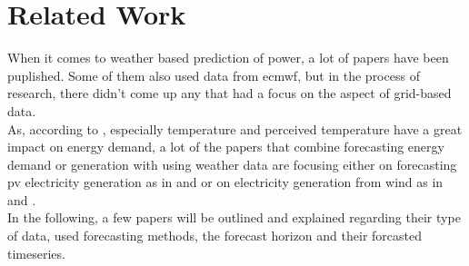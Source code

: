 \section{Related Work}
\label{sec:rw}

When it comes to weather based prediction of power, a lot of papers have been puplished. Some of them also used data from \gls{ecmwf}, but in the process of research, there didn't come up any that had a focus on the aspect of grid-based data.\\

As, according to , especially temperature and perceived temperature have a great impact on energy demand, a lot of the papers that combine forecasting energy demand or generation with using weather data are focusing either on forecasting \gls{pv} electricity generation as in  and  or on electricity generation from wind as in  and .\\

In the following, a few papers will be outlined and explained regarding their type of data, used forecasting methods, the forecast horizon and their forcasted timeseries.\\

